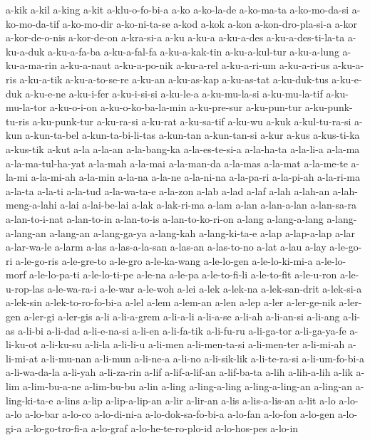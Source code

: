 {a-kik a-kil a-king a-kit a-klu-o-fo-bi-a a-ko a-ko-la-de a-ko-ma-ta
a-ko-mo-da-si a-ko-mo-da-tif a-ko-mo-dir a-ko-ni-ta-se a-kod a-kok a-kon
a-kon-dro-pla-si-a a-kor a-kor-de-o-nis a-kor-de-on a-kra-si-a a-ku a-ku-a
a-ku-a-des a-ku-a-des-ti-la-ta a-ku-a-duk a-ku-a-fa-ba a-ku-a-fal-fa
a-ku-a-kak-tin a-ku-a-kul-tur a-ku-a-lung a-ku-a-ma-rin a-ku-a-naut
a-ku-a-po-nik a-ku-a-rel a-ku-a-ri-um a-ku-a-ri-us a-ku-a-ris a-ku-a-tik
a-ku-a-to-se-re a-ku-an a-ku-as-kap a-ku-as-tat a-ku-duk-tus a-ku-e-duk
a-ku-e-ne a-ku-i-fer a-ku-i-si-si a-ku-le-a a-ku-mu-la-si a-ku-mu-la-tif
a-ku-mu-la-tor a-ku-o-i-on a-ku-o-ko-ba-la-min a-ku-pre-sur a-ku-pun-tur
a-ku-punk-tu-ris a-ku-punk-tur a-ku-ra-si a-ku-rat a-ku-sa-tif a-ku-wu
a-kuk a-kul-tu-ra-si a-kun a-kun-ta-bel a-kun-ta-bi-li-tas a-kun-tan
a-kun-tan-si a-kur a-kus a-kus-ti-ka a-kus-tik a-kut a-la a-la-an
a-la-bang-ka a-la-es-te-si-a a-la-ha-ta a-la-li-a a-la-ma
a-la-ma-tul-ha-yat a-la-mah a-la-mai a-la-man-da a-la-mas a-la-mat
a-la-me-te a-la-mi a-la-mi-ah a-la-min a-la-na a-la-ne a-la-ni-na
a-la-pa-ri a-la-pi-ah a-la-ri-ma a-la-ta a-la-ti a-la-tud a-la-wa-ta-e
a-la-zon a-lab a-lad a-laf a-lah a-lah-an a-lah-meng-a-lahi a-lai
a-lai-be-lai a-lak a-lak-ri-ma a-lam a-lan a-lan-a-lan a-lan-sa-ra
a-lan-to-i-nat a-lan-to-in a-lan-to-is a-lan-to-ko-ri-on a-lang
a-lang-a-lang a-lang-a-lang-an a-lang-an a-lang-ga-ya a-lang-kah
a-lang-ki-ta-e a-lap a-lap-a-lap a-lar a-lar-wa-le a-larm a-las
a-las-a-la-san a-las-an a-las-to-no a-lat a-lau a-lay a-le-go-ri
a-le-go-ris a-le-gre-to a-le-gro a-le-ka-wang a-le-lo-gen a-le-lo-ki-mi-a
a-le-lo-morf a-le-lo-pa-ti a-le-lo-ti-pe a-le-na a-le-pa a-le-to-fi-li
a-le-to-fit a-le-u-ron a-le-u-rop-las a-le-wa-ra-i a-le-war a-le-woh a-lei
a-lek a-lek-na a-lek-san-drit a-lek-si-a a-lek-sin a-lek-to-ro-fo-bi-a
a-lel a-lem a-lem-an a-len a-lep a-ler a-ler-ge-nik a-ler-gen a-ler-gi
a-ler-gis a-li a-li-a-grem a-li-a-li a-li-a-se a-li-ah a-li-an-si a-li-ang
a-li-as a-li-bi a-li-dad a-li-e-na-si a-li-en a-li-fa-tik a-li-fu-ru
a-li-ga-tor a-li-ga-ya-fe a-li-ku-ot a-li-ku-su a-li-la a-li-li-u a-li-men
a-li-men-ta-si a-li-men-ter a-li-mi-ah a-li-mi-at a-li-mu-nan a-li-mun
a-li-ne-a a-li-no a-li-sik-lik a-li-te-ra-si a-li-um-fo-bi-a a-li-wa-da-la
a-li-yah a-li-za-rin a-lif a-lif-a-lif-an a-lif-ba-ta a-lih a-lih-a-lih
a-lik a-lim a-lim-bu-a-ne a-lim-bu-bu a-lin a-ling a-ling-a-ling
a-ling-a-ling-an a-ling-an a-ling-ki-ta-e a-lins a-lip a-lip-a-lip-an
a-lir a-lir-an a-lis a-lis-a-lis-an a-lit a-lo a-lo-a-lo a-lo-bar a-lo-co
a-lo-di-ni-a a-lo-dok-sa-fo-bi-a a-lo-fan a-lo-fon a-lo-gen a-lo-gi-a
a-lo-go-tro-fi-a a-lo-graf a-lo-he-te-ro-plo-id a-lo-hos-pes a-lo-in
}
